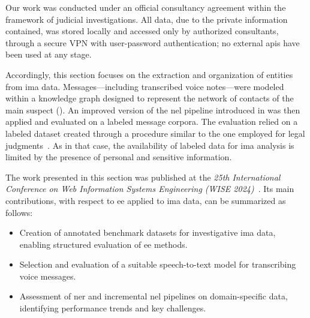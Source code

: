 Our work was conducted under an official consultancy agreement within the framework of judicial investigations. All data, due to the private information contained, was stored locally and accessed only by authorized consultants, through a secure VPN with user-password authentication; no external \acp{api} have been used at any stage.


Accordingly, this section focuses on the extraction and organization of entities from \ac{ima} data. Messages---including transcribed voice notes---were modeled within a knowledge graph designed to represent the network of contacts of the main suspect (). An improved version of the \ac{nel} pipeline introduced in  was then applied and evaluated on a labeled message corpora. The evaluation relied on a labeled dataset created through a procedure similar to the one employed for legal judgments~. As in that case, the availability of labeled data for \ac{ima} analysis is limited by the presence of personal and sensitive information.


The work presented in this section was published at the \emph{25th International Conference on Web Information Systems Engineering (WISE 2024)}~\cite{pozzi_wise_2025}. Its main contributions, with respect to \ac{ee} applied to \ac{ima} data, can be summarized as follows:
\begin{itemize}
    \item Creation of annotated benchmark datasets for investigative \ac{ima} data, enabling structured evaluation of \ac{ee} methods.
    \item Selection and evaluation of a suitable speech-to-text model for transcribing voice messages.
    \item Assessment of \ac{ner} and incremental \ac{nel} pipelines on domain-specific data, identifying performance trends and key challenges.
\end{itemize}


